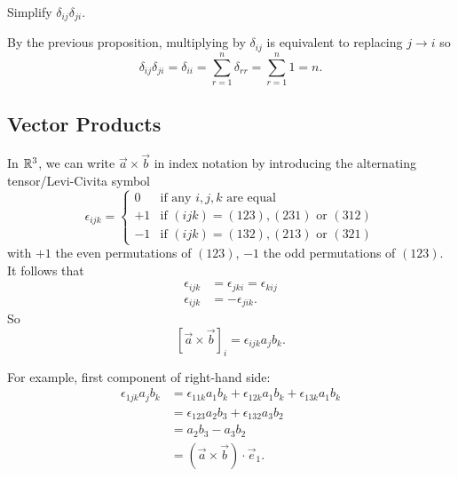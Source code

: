 \documentclass[10pt, a4paper]{article}
\begin{document}
\begin{example}
    Simplify $\delta_{ij}\delta_{ji}$.

    \begin{solution}
        By the previous proposition,
        multiplying by $\delta_{ij}$ is equivalent to replacing $j \to i$ so
        \[
        \delta_{ij}\delta_{ji} = \delta_{ii} = \sum_{r = 1}^{n}\delta_{rr} = \sum_{r = 1}^{n}1 = n.
        \]
    \end{solution}
\end{example}

\subsection{Vector Products}
In $\mathbb{R} ^ 3$,
we can write $\vec{a} \times \vec{b}$ in index notation by introducing the alternating tensor/Levi-Civita symbol
\[
\epsilon_{ijk} = \begin{cases}
    0 &\text{if any $i, j, k$ are equal} \\
    +1 &\text{if $(ijk) = (123), (231)$ or $(312)$} \\
    -1 &\text{if $(ijk) = (132), (213)$ or $(321)$}
\end{cases}
\]
with $+1$ the even permutations of $(123)$,
$-1$ the odd permutations of $(123)$.
It follows that
\begin{align*}
    \epsilon_{ijk} &= \epsilon_{jki} = \epsilon_{kij} \\
    \epsilon_{ijk} &= -\epsilon_{jik}.
\end{align*}
So
\[
[\vec{a} \times \vec{b}]_i = \epsilon_{ijk}a_jb_k.
\]

For example,
first component of right-hand side:
\begin{align*}
    \epsilon_{1jk}a_jb_k &= \epsilon_{11k}a_1b_k + \epsilon_{12k}a_1b_k + \epsilon_{13k}a_1b_k \\
    &= \epsilon_{123}a_2b_3 + \epsilon_{132}a_3b_2 \\
    &= a_2b_3 - a_3b_2 \\
    &= (\vec{a} \times \vec{b})\cdot\vec{e}_1.
\end{align*}
\end{document}
